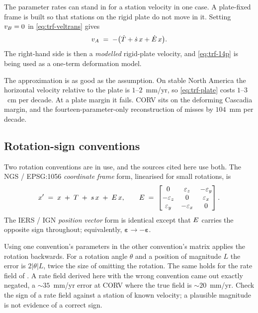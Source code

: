 \documentclass[main.tex]{subfiles}
\begin{document}
The parameter rates can stand in for a station velocity in one case.
A plate-fixed frame is built so that stations on the rigid plate do not
move in it.  Setting $v_B = 0$ in \eqref{eq:trf-veltrans}
gives
\begin{equation}
v_A \;=\; -\bigl(\dot{T} + \dot{s}\,x
                        + \dot{E}\,x\bigr).
\label{eq:trf-plate}
\end{equation}
The right-hand side is then a \emph{modelled} rigid-plate velocity, and
\eqref{eq:trf-14p} is being used as a one-term deformation model.

The approximation is as good as the assumption.  On stable North
America the horizontal velocity relative to the plate is
$1$--$2$~mm/yr, so \eqref{eq:trf-plate} costs $1$--$3$~cm per decade.
At a plate margin it fails.  CORV sits on the deforming Cascadia
margin, and the fourteen-parameter-only reconstruction of
 misses by $104$~mm per decade.


\subsection{Rotation-sign conventions}\label{sec:trf-conv}

Two rotation conventions are in use, and the sources cited here use
both.  The NGS / EPSG:1056 \emph{coordinate frame} form, linearised for
small rotations, is
\begin{equation}
x' \;=\; x \;+\; T \;+\; s\,x \;+\; E\,x,
\qquad
E \;=\;
\begin{bmatrix}
 0        & \varepsilon_z & -\varepsilon_y \\
-\varepsilon_z & 0        &  \varepsilon_x \\
 \varepsilon_y & -\varepsilon_x & 0
\end{bmatrix}.
\label{eq:trf-cf}
\end{equation}
The IERS / IGN \emph{position vector} form is identical except that
$E$ carries the opposite sign throughout; equivalently,
$\bm{\varepsilon} \to -\bm{\varepsilon}$.

Using one convention's parameters in the other convention's matrix
applies the rotation backwards.  For a rotation angle $\theta$ and a
position of magnitude $L$ the error is $2\lvert\theta\rvert L$, twice
the size of omitting the rotation.  The same holds for the rate field
of .  A rate field derived here with the wrong
convention came out exactly negated, a $\sim\!35$~mm/yr error at CORV
where the true field is $\sim\!20$~mm/yr.  Check the sign of a rate
field against a station of known velocity; a plausible magnitude is not
evidence of a correct sign.
\end{document}
